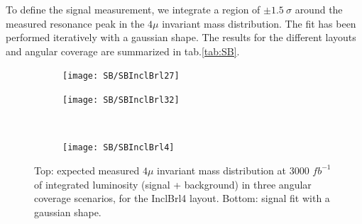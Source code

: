 \documentclass[a4paper,twoside,12pt]{article}
\begin{document}
To define the signal measurement, we integrate a region of $\pm 1.5\ \sigma$ around the measured resonance peak in the $4\mu$ invariant mass distribution. The fit has been performed iteratively 
with a gaussian shape. The results for the different layouts and angular coverage are summarized in tab.\ref{tab:SB}.

\begin{figure}
\begin{subfigure}{.5\linewidth}
\texttt{[image: SB/SBInclBrl27]}
\caption{}
\label{fig:SBInclBrl27}
\end{subfigure}
\begin{subfigure}{.5\linewidth}
\centering
\texttt{[image: SB/SBInclBrl32]}
\caption{}
\label{fig:SBInclBrl32}
\end{subfigure}\\[1ex]
\begin{subfigure}{\linewidth}
\centering
\texttt{[image: SB/SBInclBrl4]}
\caption{}
\label{fig:SBInclBrl4}
\end{subfigure}
\caption{Top: expected measured $4\mu$ invariant mass distribution at 3000 $fb^{-1}$ of integrated luminosity (signal + background) in
	three angular coverage scenarios, for the InclBrl4 layout. Bottom: signal fit with a gaussian shape.	 }
\label{fig:SB}
\end{figure}
\end{document}
